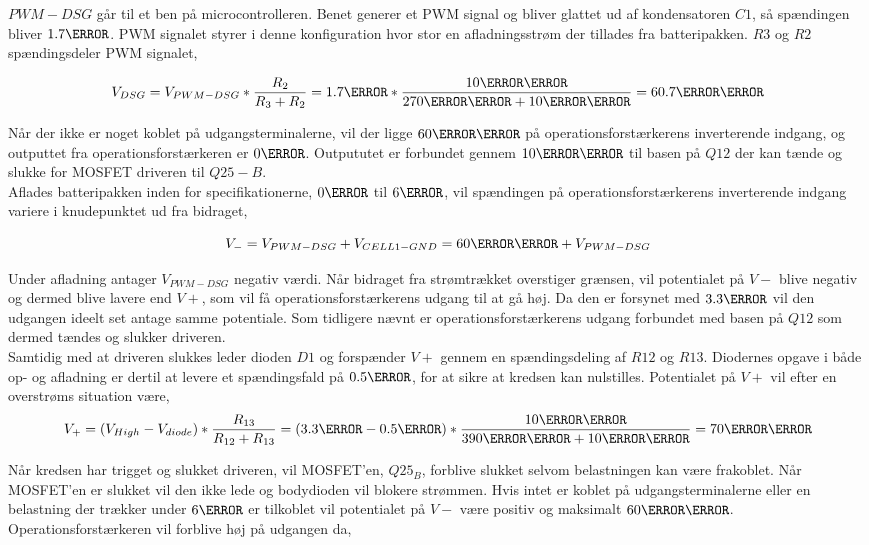 $PWM-DSG$ går til et ben på microcontrolleren. Benet generer et PWM signal og bliver glattet ud af kondensatoren $C1$, så spændingen bliver $1.7\volt$. PWM signalet styrer i denne konfiguration hvor stor en afladningsstrøm der tillades fra batteripakken. $R3$ og $R2$ spændingsdeler PWM signalet,

\begin {equation} 
V_{DSG} = V_{PWM-DSG} * \frac{R_{2}}{R_{3}+R_{2}} = 1.7\volt * \frac{10\kilo\ohm}{270\kilo\ohm + 10\kilo\ohm} = 60.7\milli\volt
\end {equation}

Når der ikke er noget koblet på udgangsterminalerne, vil der ligge $60\milli\volt$ på operationsforstærkerens inverterende indgang, og outputtet fra operationsforstærkeren er $0\volt$. Outpututet er forbundet gennem $10\kilo\ohm$ til basen på $Q12$ der kan tænde og slukke for MOSFET driveren til $Q25-B$.
\\

Aflades batteripakken inden for specifikationerne, $0\ampere$ til $6\ampere$, vil spændingen på operationsforstærkerens inverterende indgang variere i knudepunktet ud fra bidraget,

\begin {equation} 
V_{-} = V_{PWM-DSG} + V_{CELL1-GND} = 60\milli\volt + V_{PWM-DSG}
\end {equation}

Under afladning antager $V_{PWM-DSG}$ negativ værdi. Når bidraget fra  strømtrækket overstiger grænsen, vil potentialet på $V-$ blive negativ og dermed blive lavere end $V+$, som vil få operationsforstærkerens udgang til at gå høj. Da den er forsynet med $3.3\volt$ vil den udgangen ideelt set antage samme potentiale. Som tidligere nævnt er operationsforstærkerens udgang forbundet med basen på $Q12$ som dermed tændes og slukker driveren.
\\
Samtidig med at driveren slukkes leder dioden $D1$ og forspænder $V+$ gennem en spændingsdeling af $R12$ og $R13$. Diodernes opgave i både op- og afladning er dertil at levere et spændingsfald på $0.5\volt$, for at sikre at kredsen kan nulstilles. Potentialet på $V+$ vil efter en overstrøms situation være,
\begin {equation} 
V_{+} = (V_{High} - V_{diode} ) * \frac{R_{13}}{R_{12}+R_{13}} = (3.3\volt - 0.5\volt ) * \frac{10\kilo\ohm}{390\kilo\ohm + 10\kilo\ohm} =  70\milli\volt
\end {equation}

Når kredsen har trigget og slukket driveren, vil MOSFET'en, $Q25_B$, forblive slukket selvom belastningen kan være frakoblet. Når MOSFET'en er slukket vil den ikke lede og bodydioden vil blokere strømmen.
Hvis intet er koblet på udgangsterminalerne eller en belastning der trækker under $6\ampere$ er tilkoblet vil potentialet på $V-$ være positiv og maksimalt $60\milli\volt$. Operationsforstærkeren vil forblive høj på udgangen da,

